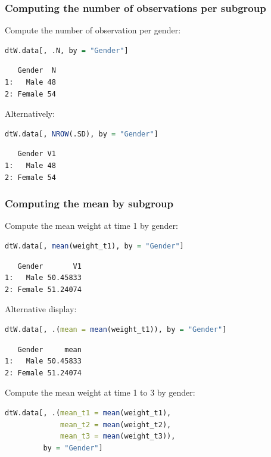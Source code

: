 \documentclass{article}
\begin{document}
\subsubsection{Computing the number of observations per subgroup}
\label{sec:org7bb586b}
Compute the number of observation per gender:
\begin{lstlisting}[language=r,numbers=none]
dtW.data[, .N, by = "Gender"]
\end{lstlisting}

\label{}
\begin{verbatim}
   Gender  N
1:   Male 48
2: Female 54
\end{verbatim}


Alternatively:
\begin{lstlisting}[language=r,numbers=none]
dtW.data[, NROW(.SD), by = "Gender"]
\end{lstlisting}

\label{}
\begin{verbatim}
   Gender V1
1:   Male 48
2: Female 54
\end{verbatim}
\subsubsection{Computing the mean by subgroup}
\label{sec:org07ec974}

Compute the mean weight at time 1 by gender:
\begin{lstlisting}[language=r,numbers=none]
dtW.data[, mean(weight_t1), by = "Gender"]
\end{lstlisting}

\label{}
\begin{verbatim}
   Gender       V1
1:   Male 50.45833
2: Female 51.24074
\end{verbatim}


Alternative display:
\begin{lstlisting}[language=r,numbers=none]
dtW.data[, .(mean = mean(weight_t1)), by = "Gender"]
\end{lstlisting}

\label{}
\begin{verbatim}
   Gender     mean
1:   Male 50.45833
2: Female 51.24074
\end{verbatim}


Compute the mean weight at time 1 to 3 by gender:
\begin{lstlisting}[language=r,numbers=none]
dtW.data[, .(mean_t1 = mean(weight_t1),
             mean_t2 = mean(weight_t2),
             mean_t3 = mean(weight_t3)), 
         by = "Gender"]
\end{lstlisting}
\end{document}
